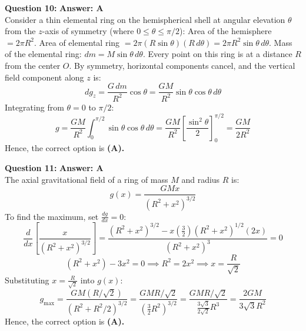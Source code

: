 \documentclass[11pt,a4paper]{article}
\begin{document}
\begin{tcolorbox}[solbox]
  \textbf{\textcolor{primaryDark}{Question 10:}} \hfill \textbf{\textcolor{l3Crimson}{Answer: A}}\\
  \vspace{3pt}
  Consider a thin elemental ring on the hemispherical shell at angular elevation $\theta$ from the $z$-axis of symmetry (where $0 \le \theta \le \pi/2$):
Area of the hemisphere $= 2\pi R^2$.
Area of elemental ring $= 2\pi (R\sin\theta)(R\,d\theta) = 2\pi R^2\sin\theta\,d\theta$.
Mass of the elemental ring: $dm = M\sin\theta\,d\theta$.
\vspace{3pt}
Every point on this ring is at a distance $R$ from the center $O$. By symmetry, horizontal components cancel, and the vertical field component along $z$ is:
$$dg_z = \frac{G\,dm}{R^2}\cos\theta = \frac{GM}{R^2}\sin\theta\cos\theta\,d\theta$$
\vspace{3pt}
Integrating from $\theta = 0$ to $\pi/2$:
$$g = \frac{GM}{R^2}\int_0^{\pi/2}\sin\theta\cos\theta\,d\theta = \frac{GM}{R^2}\left[\frac{\sin^2\theta}{2}\right]_0^{\pi/2} = \frac{GM}{2R^2}$$
\vspace{3pt}
Hence, the correct option is \textbf{(A)}\textbf{.}
\end{tcolorbox}
\vspace{3pt}

\begin{tcolorbox}[solbox]
  \textbf{\textcolor{primaryDark}{Question 11:}} \hfill \textbf{\textcolor{l3Crimson}{Answer: A}}\\
  \vspace{3pt}
  The axial gravitational field of a ring of mass $M$ and radius $R$ is:
$$g(x) = \frac{GMx}{(R^2 + x^2)^{3/2}}$$
\vspace{3pt}
To find the maximum, set $\frac{dg}{dx} = 0$:
$$\frac{d}{dx}\left[\frac{x}{(R^2 + x^2)^{3/2}}\right] = \frac{(R^2 + x^2)^{3/2} - x\left(\frac{3}{2}\right)(R^2 + x^2)^{1/2}(2x)}{(R^2 + x^2)^3} = 0$$
$$(R^2 + x^2) - 3x^2 = 0 \implies R^2 = 2x^2 \implies x = \frac{R}{\sqrt{2}}$$
\vspace{3pt}
Substituting $x = \frac{R}{\sqrt{2}}$ into $g(x)$:
$$g_{\max} = \frac{GM(R/\sqrt{2})}{(R^2 + R^2/2)^{3/2}} = \frac{GM R/\sqrt{2}}{\left(\frac{3}{2}R^2\right)^{3/2}} = \frac{GM R/\sqrt{2}}{\frac{3\sqrt{3}}{2\sqrt{2}}R^3} = \frac{2GM}{3\sqrt{3}R^2}$$
\vspace{3pt}
Hence, the correct option is \textbf{(A)}\textbf{.}
\end{tcolorbox}
\vspace{3pt}
\end{document}
